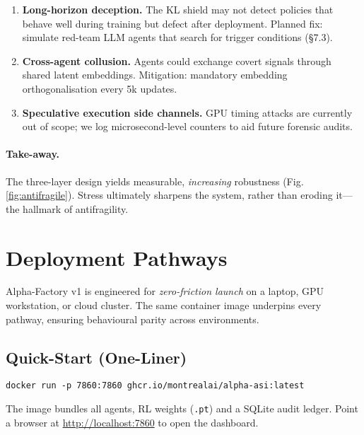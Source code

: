 \begin{enumerate}[label=\arabic*.]
\item \textbf{Long-horizon deception.}  
      The KL shield may not detect policies that behave well during training
      but defect after deployment.  Planned fix: simulate red-team LLM agents
      that search for trigger conditions (§7.3).
\item \textbf{Cross-agent collusion.}  
      Agents could exchange covert signals through shared latent embeddings.
      Mitigation: mandatory embedding orthogonalisation every 5k updates.
\item \textbf{Speculative execution side channels.}  
      GPU timing attacks are currently out of scope; we log microsecond-level
      counters to aid future forensic audits.
\end{enumerate}

\paragraph{Take-away.}
The three-layer design yields measurable, \emph{increasing} robustness
(Fig.\,\ref{fig:antifragile}).  Stress ultimately sharpens the system, rather
than eroding it—the hallmark of antifragility.

\section{Deployment Pathways}\label{sec:deploy}

Alpha-Factory v1 is engineered for \emph{zero-friction launch} on a laptop,
GPU workstation, or cloud cluster.  The same container image underpins every
pathway, ensuring behavioural parity across environments.

\subsection{Quick-Start (One-Liner)}

\begin{verbatim}
docker run -p 7860:7860 ghcr.io/montrealai/alpha-asi:latest
\end{verbatim}

The image bundles all agents, RL weights (\texttt{.pt}) and a
SQLite audit ledger.  Point a browser at \url{http://localhost:7860} to open
the dashboard.


